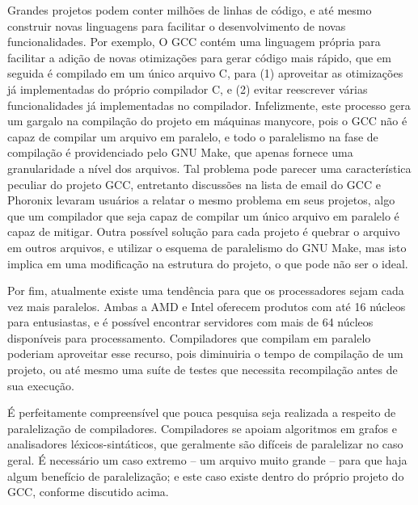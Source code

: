 Grandes projetos podem conter milhões de linhas de código, e até mesmo
construir novas linguagens para facilitar o desenvolvimento de novas
funcionalidades. Por exemplo, O GCC contém uma linguagem própria para facilitar
a adição de novas otimizações para gerar código mais rápido, que em seguida é
compilado em um único arquivo C, para (1) aproveitar as otimizações já
implementadas do próprio compilador C, e (2) evitar reescrever várias
funcionalidades já implementadas no compilador. Infelizmente, este processo
gera um gargalo na compilação do projeto em máquinas manycore, pois o GCC não é
capaz de compilar um arquivo em paralelo, e todo o paralelismo na fase de
compilação é providenciado pelo GNU Make, que apenas fornece uma granularidade
a nível dos arquivos. Tal problema pode parecer uma característica peculiar do
projeto GCC, entretanto discussões na lista de email do GCC \citep{mailgcc} e Phoronix levaram
usuários a relatar o mesmo problema em seus projetos, algo que um compilador
que seja capaz de compilar um único arquivo em paralelo é capaz de mitigar.
Outra possível solução para cada projeto é quebrar o arquivo em outros
arquivos, e utilizar o esquema de paralelismo do GNU Make, mas isto implica em
uma modificação na estrutura do projeto, o que pode não ser o ideal.

Por fim, atualmente existe uma tendência para que os processadores sejam cada vez mais
paralelos. Ambas a AMD e Intel oferecem produtos com até 16 núcleos para
entusiastas, e é possível encontrar servidores com mais de 64 núcleos
disponíveis para processamento. Compiladores que compilam em paralelo poderiam
aproveitar esse recurso, pois diminuiria o tempo de compilação de um projeto,
ou até mesmo uma suíte de testes que necessita recompilação antes de sua
execução.

É perfeitamente compreensível que pouca pesquisa seja realizada a
respeito de paralelização de compiladores. Compiladores se apoiam algoritmos em
grafos e analisadores léxicos-sintáticos, que geralmente são difíceis de
paralelizar no caso geral. É necessário um caso extremo -- um arquivo muito
grande -- para que haja algum benefício de paralelização; e este caso existe
dentro do próprio projeto do GCC, conforme discutido acima.



